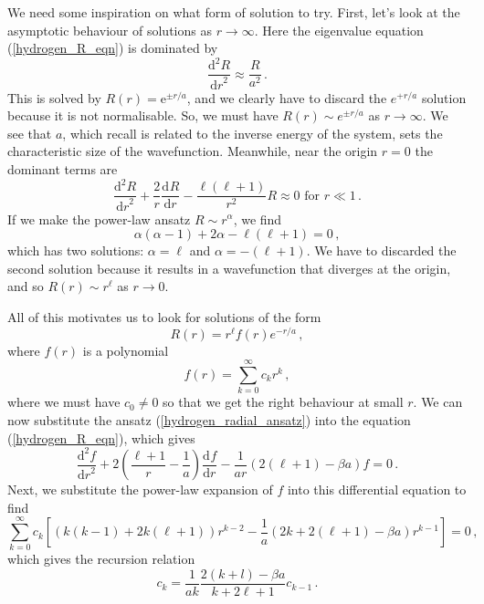 \documentclass{article}
\theoremstyle{plain}\theoremheaderfont{\normalfont\itshape}\theorembodyfont{\rmfamily}\theoremseparator{.}\newtheorem*{rem}{Remark}\newtheorem*{ex}{Example}\newtheorem*{proof}{Proof}\newtheorem*{altp}{Alternative proof}
\theoremstyle{plain}\theoremheaderfont{\normalfont\bfseries}\theorembodyfont{\rmfamily}\theoremseparator{.}\newtheorem{thm}{Theorem}[section]\newtheorem{lem}[thm]{Lemma}\newtheorem{prop}[thm]{Proposition}\newtheorem*{cor}{Corollary}\newtheorem{defn}[thm]{Definition}\newtheorem{clm}[thm]{Claim}\newtheorem{clminproof}{Claim}
\theoremstyle{break}\theoremheaderfont{\normalfont\itshape}\theorembodyfont{\rmfamily}\theoremseparator{.\medskip}\newtheorem*{proofskip}{Proof}\newtheorem*{exs}{Examples}\newtheorem*{rems}{Remarks}
\theoremstyle{break}\theoremheaderfont{\normalfont\bfseries}\theorembodyfont{\rmfamily}\theoremseparator{.\medskip}\newtheorem{lemskip}[thm]{Lemma}\newtheorem{defnskip}[thm]{Definition}\newtheorem{propskip}[thm]{Proposition}\newtheorem{thmskip}[thm]{Theorem}
\numberwithin{equation}{section}
\newcommand{\ee}{\mathrm{e}}
\newcommand{\dv}[3][]{\frac{\mathrm{d}^{#1} #2}{{\mathrm{d} #3}^{#1}}}
\begin{document}
    We need some inspiration on what form of solution to try. First, let's look at the asymptotic behaviour of solutions as \(r\to\infty\). Here the eigenvalue equation (\ref{hydrogen_R_eqn}) is dominated by
    \begin{equation}\label{hydrogenasympatinfty}
         \dv[2]{R}{r}\approx\frac{R}{a^2}\,.
    \end{equation}
    This is solved by \(R(r)=\ee^{\pm r/a}\), and we clearly have to discard the \(e^{+r/a}\) solution because it is not normalisable. So, we must have \(R(r)\sim e^{\pm r/a}\) as \(r\to\infty\). We see that \(a\), which recall is related to the inverse energy of the system, sets the characteristic size of the wavefunction. Meanwhile, near the origin \(r=0\) the dominant terms are
   \begin{equation}
        \dv[2]{R}{r}+\frac{2}{r}\dv{R}{r}-\frac{\ell(\ell+1)}{r^2}R\approx 0\text{ for }r\ll 1\,.
    \end{equation}
    If we make the power-law ansatz \(R\sim r^\alpha\), we find
   \begin{equation}
        \alpha(\alpha-1)+2\alpha-\ell(\ell+1)=0\,,
    \end{equation}
    which has two solutions: \(\alpha=\ell\) and \(\alpha=-(\ell+1)\). We have to discarded the second solution because it results in a wavefunction that diverges at the origin, and so \(R(r)\sim r^\ell\) as \(r\to 0\).

    All of this motivates us to look for solutions of the form
    \begin{equation}\label{hydrogen_radial_ansatz}
        R(r)=r^\ell f(r)e^{-r/a}\,,
    \end{equation}
    where \(f(r)\) is a polynomial
   \begin{equation}
        f(r)=\sum_{k=0}^{\infty}c_kr^k\,,
    \end{equation}
    where we must have \(c_0\ne 0\) so that we get the right behaviour at small \(r\). We can now substitute the ansatz (\ref{hydrogen_radial_ansatz}) into the equation (\ref{hydrogen_R_eqn}), which gives
   \begin{equation}
        \dv[2]{f}{r}+2\left(\frac{\ell+1}{r}-\frac{1}{a}\right)\dv{f}{r}-\frac{1}{ar}\left(2(\ell+1)-\beta a\right)f=0\,.
    \end{equation}
    Next, we substitute the power-law expansion of \(f\) into this differential equation to find
   \begin{equation}
        \sum_{k=0}^{\infty}c_k\left[(k(k-1)+2k(\ell+1))r^{k-2}-\frac{1}{a}(2k+2(\ell+1)-\beta a)r^{k-1}\right]=0\,,
    \end{equation}
    which gives the recursion relation
    \begin{equation}\label{hydrogen_recursion}
        c_k=\frac{1}{ak}\frac{2(k+l)-\beta a}{k+2\ell+1}c_{k-1}\,.
    \end{equation}
\end{document}
